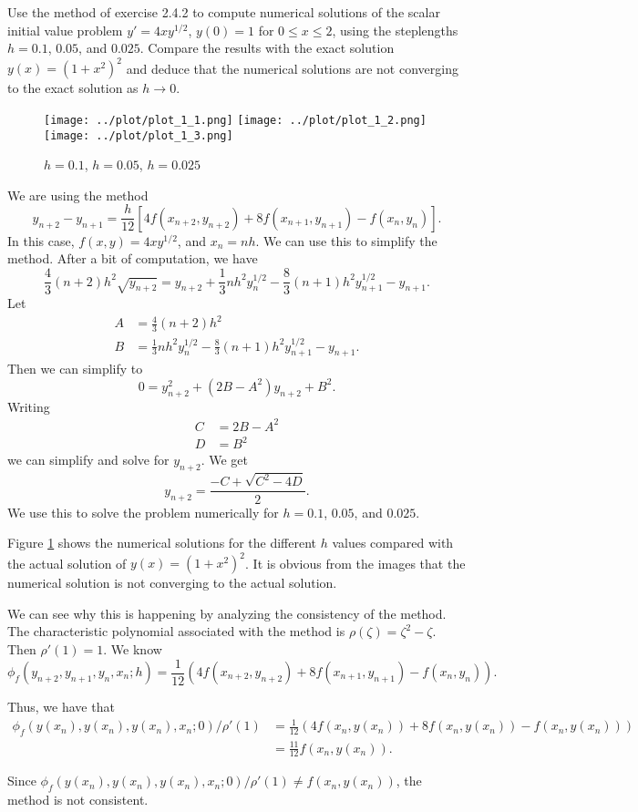 \begin{problem}[L 2.4.2]
  Use the method of exercise 2.4.2 to compute numerical solutions of the scalar initial value problem $y' = 4xy^{1/2}$, $y(0) = 1$ for $0 \leq x \leq 2$, using the steplengths $h = 0.1$, $0.05$, and $0.025$. Compare the results with the exact solution $y(x) = (1 + x^2)^2$ and deduce that the numerical solutions are not converging to the exact solution as $h \to 0$.
\end{problem}

\begin{solution}
  \begin{figure}[!ht]
    \centering
    \texttt{[image: ../plot/plot\_1\_1.png]}
    \texttt{[image: ../plot/plot\_1\_2.png]}
    \texttt{[image: ../plot/plot\_1\_3.png]}
    \caption{$h = 0.1$, $h = 0.05$, $h = 0.025$}
    \label{fig:prob1}
  \end{figure}
  We are using the method
  \[
    y_{n + 2} - y_{n + 1} = \frac{h}{12}\left[4 f(x_{n + 2}, y_{n + 2}) + 8 f(x_{n + 1}, y_{n + 1}) - f(x_n, y_n)\right].
  \]
  In this case, $f(x, y) = 4xy^{1/2}$, and $x_n = nh$. We can use this to simplify the method. After a bit of computation, we have
  \[
    \frac{4}{3} (n + 2) h^2 \sqrt{y_{n + 2}} = y_{n + 2} + \frac{1}{3} n h^2 y_n^{1/2} - \frac{8}{3} (n + 1) h^2 y_{n + 1}^{1/2} - y_{n + 1}.
  \]
  Let
  \begin{align*}
    A &= \frac{4}{3} (n + 2) h^2 \\
    B &= \frac{1}{3} n h^2 y_n^{1/2} - \frac{8}{3} (n + 1) h^2 y_{n + 1}^{1/2} - y_{n + 1}.
  \end{align*}
  Then we can simplify to
  \[
    0 = y_{n+2}^2 + (2B - A^2)y_{n+2} + B^2.
  \]
  Writing 
  \begin{align*}
    C &= 2B - A^2 \\
    D &= B^2
  \end{align*}
  we can simplify and solve for $y_{n+2}$. We get
  \[
    y_{n + 2} = \frac{-C + \sqrt{C^2 - 4D}}{2}.
  \]
  We use this to solve the problem numerically for $h = 0.1$, $0.05$, and $0.025$.
  
  Figure \ref{fig:prob1} shows the numerical solutions for the different $h$ values compared with the actual solution of $y(x) = (1+x^2)^2$. It is obvious from the images that the numerical solution is not converging to the actual solution.
  
  We can see why this is happening by analyzing the consistency of the method. The characteristic polynomial associated with the method is $\rho(\zeta) = \zeta^2 - \zeta$. Then $\rho'(1) = 1$. We know
  \[
    \phi_f(y_{n+2}, y_{n+1}, y_n, x_n; h) = \frac{1}{12}(4f(x_{n+2},y_{n+2}) + 8f(x_{n+1}, y_{n+1}) - f(x_n, y_n)).
  \]
  
  Thus, we have that
  \begin{align*}
    \phi_f(y(x_n), y(x_n), y(x_n), x_n; 0)/\rho'(1)
    &= \tfrac{1}{12}(4f(x_n,y(x_n)) + 8f(x_n, y(x_n)) - f(x_n, y(x_n))) \\
    &= \tfrac{11}{12}f(x_n,y(x_n)).
  \end{align*}
  
  Since $\phi_f(y(x_n), y(x_n), y(x_n), x_n; 0)/\rho'(1) \neq f(x_n,y(x_n))$, the method is not consistent.
\end{solution}
